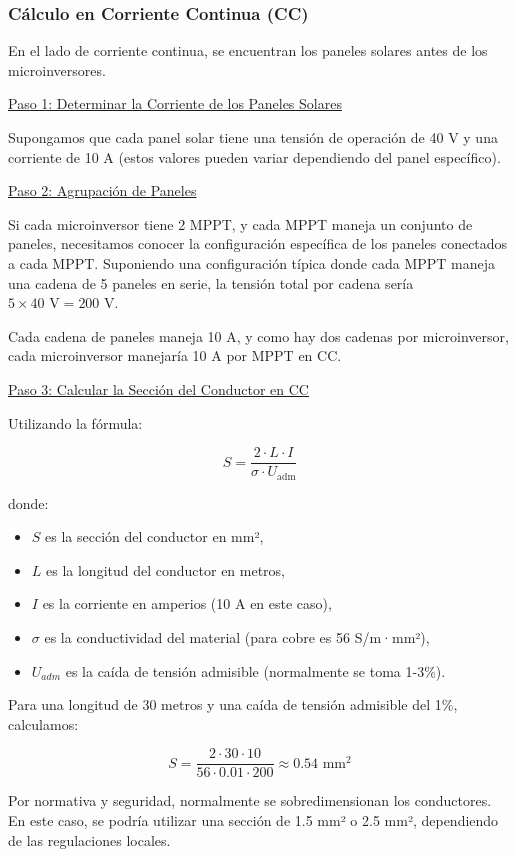 \documentclass[a4paper,12pt]{article}
\begin{document}
\begin{Form}
\subsubsection{Cálculo en Corriente Continua (CC)}

En el lado de corriente continua, se encuentran los paneles solares antes de los microinversores.

\uline{Paso 1: Determinar la Corriente de los Paneles Solares}

Supongamos que cada panel solar tiene una tensión de operación de 40 V y una corriente de 10 A (estos valores pueden variar dependiendo del panel específico).

\uline{Paso 2: Agrupación de Paneles}

Si cada microinversor tiene 2 MPPT, y cada MPPT maneja un conjunto de paneles, necesitamos conocer la configuración específica de los paneles conectados a cada MPPT. Suponiendo una configuración típica donde cada MPPT maneja una cadena de 5 paneles en serie, la tensión total por cadena sería \(5 \times 40 \text{ V} = 200 \text{ V}\).

Cada cadena de paneles maneja 10 A, y como hay dos cadenas por microinversor, cada microinversor manejaría 10 A por MPPT en CC.

\uline{Paso 3: Calcular la Sección del Conductor en CC}

Utilizando la fórmula:

$$
S = \frac{2 \cdot L \cdot I}{\sigma \cdot U_{\text{adm}}}
$$

donde:
\begin{itemize}
    \item \(S\) es la sección del conductor en mm²,
    \item \(L\) es la longitud del conductor en metros,
    \item \(I\) es la corriente en amperios (10 A en este caso),
    \item \(\sigma\) es la conductividad del material (para cobre es 56 S/m·mm²),
    \item $U_{adm}$ es la caída de tensión admisible (normalmente se toma 1-3\%).
\end{itemize}

Para una longitud de 30 metros y una caída de tensión admisible del 1\%, calculamos:

$$
S = \frac{2 \cdot 30 \cdot 10}{56 \cdot 0.01 \cdot 200} \approx 0.54 \text{ mm}^2
$$

Por normativa y seguridad, normalmente se sobredimensionan los conductores. En este caso, se podría utilizar una sección de 1.5 mm² o 2.5 mm², dependiendo de las regulaciones locales.


\end{Form}
\end{document}
